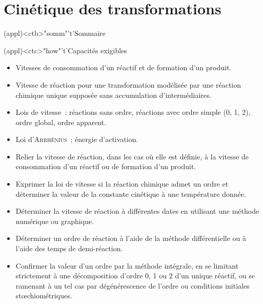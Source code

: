 \documentclass[../../main/main.tex]{subfiles}
\begin{document}
\setcounter{chapter}{2}



\chapter{Cin\'etique des transformations}

\vspace*{\fill}

\begin{tcn}(appl)<ctb>"somm"'t'{Sommaire}
	\let\item\olditem
	\vspace{-15pt}
	\minitoc
	\vspace{-15pt}
\end{tcn}

\vspace*{\fill}
\newpage
\vspace*{\fill}

\begin{tcn}[sidebyside](appl)<ctc>"how"'t'{Capacités exigibles}
	\begin{itemize}[label=\rcheck]
		\item Vitesses de consommation d'un réactif et de formation d'un produit.
		\item Vitesse de réaction pour une transformation modélisée par une
		      réaction chimique unique supposée sans accumulation
		      d’intermédiaires.
		\item Lois de vitesse~: réactions sans ordre, réactions avec ordre simple
		      (0, 1, 2), ordre global, ordre apparent.
		\item Loi d'\textsc{Arrhénius}~; énergie d'activation.
		\item Relier la vitesse de réaction, dans les cas où elle est définie, à
		      la vitesse de consommation d’un réactif ou de formation d’un
		      produit.
	\end{itemize}
	\tcblower
	\begin{itemize}[label=\rcheck]
		\item Exprimer la loi de vitesse si la réaction chimique admet un ordre et
		      déterminer la valeur de la constante cinétique à une température
		      donnée.
		\item Déterminer la vitesse de réaction à différentes dates en utilisant
		      une méthode numérique ou graphique.
		\item Déterminer un ordre de réaction à l’aide de la méthode
		      différentielle ou à l’aide des temps de demi-réaction.
		\item Confirmer la valeur d'un ordre par la méthode intégrale, en se
		      limitant strictement à une décomposition d'ordre 0, 1 ou 2 d'un
		      unique réactif, ou se ramenant à un tel cas par dégénérescence de
		      l'ordre ou conditions initiales stœchiométriques.
	\end{itemize}
\end{tcn}
\vspace{-23pt}
\end{document}
